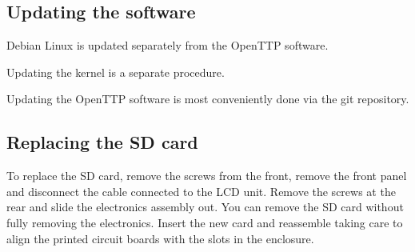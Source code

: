 \subsection{Updating the software}

Debian Linux is updated separately from the OpenTTP software.

Updating the kernel is a separate procedure. 

Updating the OpenTTP software is most conveniently done via the git repository.

\subsection{Replacing the SD card}

To replace the SD card, remove the screws from the front, remove the front panel and disconnect the cable connected to the LCD unit.
Remove the screws at the rear and slide the electronics assembly out. You can remove the SD card without fully removing the electronics.
Insert the new card and reassemble taking care to align the printed circuit boards with the slots in the enclosure.

